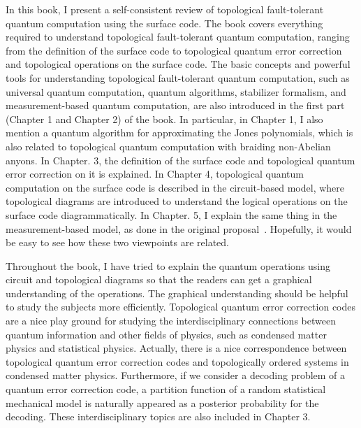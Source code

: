 In this book, 
I present 
a self-consistent review of 
topological fault-tolerant quantum computation
using the surface code.
The book covers 
everything required to 
understand topological 
fault-tolerant quantum computation,
ranging from the definition of the surface code
to topological quantum error correction and 
topological operations on the surface code.
The basic concepts and powerful tools for understanding 
topological fault-tolerant quantum computation, such as 
universal quantum computation, quantum algorithms, stabilizer formalism, 
and measurement-based quantum computation,
are also introduced in the first part (Chapter 1 and Chapter 2) of the book.
In particular, in Chapter 1, I also mention
a quantum algorithm for approximating 
the Jones polynomials,
which is also related to topological quantum computation
with braiding non-Abelian anyons.
In Chapter. 3, the definition of the surface code and 
topological quantum error correction on it is explained. 
In Chapter 4, topological quantum computation on the surface code
is described in the circuit-based model,
where topological diagrams are introduced
to understand the logical operations on the surface code diagrammatically.
In Chapter. 5, 
I explain the same thing in the measurement-based model,
as done in the original proposal~\cite{RaussendorfAnn}.
Hopefully, it would be easy to see how these two viewpoints are related.

Throughout the book, 
I have tried to explain the quantum operations 
using circuit and topological diagrams 
so that the readers can get a graphical understanding of the operations.
The graphical understanding should be helpful to study
the subjects more efficiently.
Topological quantum error correction codes 
are a nice play ground for studying
the interdisciplinary connections between 
quantum information and other fields of physics,
such as condensed matter physics and statistical physics.
Actually, there is a nice correspondence between 
topological quantum error correction codes and topologically ordered
systems in condensed matter physics.
Furthermore, if we consider a decoding problem of 
a quantum error correction code,
a partition function of a random statistical mechanical model
is naturally appeared as a posterior probability for the decoding.
These interdisciplinary topics are also included in Chapter 3.

